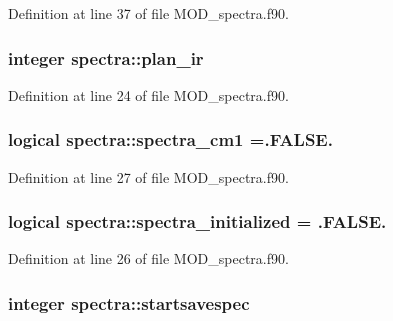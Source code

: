 Definition at line 37 of file M\-O\-D\-\_\-spectra.\-f90.

\hypertarget{classspectra_a995a9e3efec5854dc763bccdc424d47e}{
\subsubsection[{plan\-\_\-ir}]{\setlength{\rightskip}{0pt plus 5cm}integer spectra\-::plan\-\_\-ir}}\label{classspectra_a995a9e3efec5854dc763bccdc424d47e}


Definition at line 24 of file M\-O\-D\-\_\-spectra.\-f90.

\hypertarget{classspectra_a4fa256bf10ebce828d63f4b324c55116}{
\subsubsection[{spectra\-\_\-cm1}]{\setlength{\rightskip}{0pt plus 5cm}logical spectra\-::spectra\-\_\-cm1 =.F\-A\-L\-S\-E.}}\label{classspectra_a4fa256bf10ebce828d63f4b324c55116}


Definition at line 27 of file M\-O\-D\-\_\-spectra.\-f90.

\hypertarget{classspectra_a4f6272434253b12d66be37f65b81b054}{
\subsubsection[{spectra\-\_\-initialized}]{\setlength{\rightskip}{0pt plus 5cm}logical spectra\-::spectra\-\_\-initialized = .F\-A\-L\-S\-E.}}\label{classspectra_a4f6272434253b12d66be37f65b81b054}


Definition at line 26 of file M\-O\-D\-\_\-spectra.\-f90.

\hypertarget{classspectra_abfab3c8bd49f7558f03c92c031b7721a}{
\subsubsection[{startsavespec}]{\setlength{\rightskip}{0pt plus 5cm}integer spectra\-::startsavespec}}\label{classspectra_abfab3c8bd49f7558f03c92c031b7721a}


